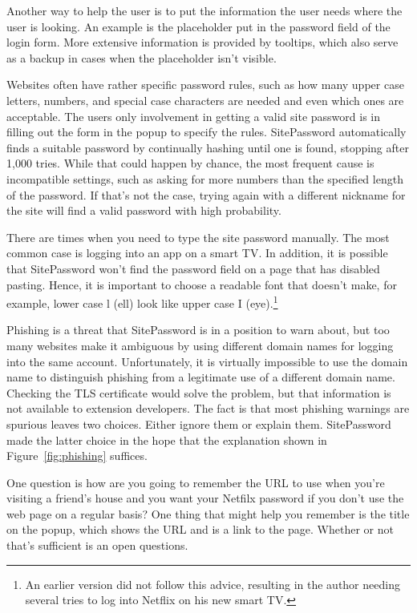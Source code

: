 Another way to help the user is to put the information the user needs where the user is looking.  An example is the placeholder put in the password field of the login form. More extensive information is provided by tooltips, which also serve as a backup in cases when the placeholder isn't visible.

Websites often have rather specific password rules, such as how many upper case letters, numbers, and special case characters are needed and even which ones are acceptable.  The users only involvement in getting a valid site password is in filling out the form in the popup to specify the rules.  SitePassword automatically finds a suitable password by continually hashing until one is found, stopping after 1,000 tries.  While that could happen by chance, the most frequent cause is incompatible settings, such as asking for more numbers than the specified length of the password.  If that's not the case, trying again with a different nickname for the site will find a valid password with high probability.

There are times when you need to type the site password manually.  The most common case is logging into an app on a smart TV.  In addition, it is possible that SitePassword won't find the password field on a page that has disabled pasting.  Hence, it is important to choose a readable font that doesn't make, for example, lower case l (ell) look like upper case I (eye).\footnote{An earlier version did not follow this advice, resulting in the author needing several tries to log into Netflix on his new smart TV.} 

Phishing is a threat that SitePassword is in a position to warn about, but too many websites make it ambiguous by using different domain names for logging into the same account.  Unfortunately, it is virtually impossible to use the domain name to distinguish phishing from a legitimate use of a different domain name.  Checking the TLS certificate would solve the  problem, but that information is not available to extension developers.  The fact is that most phishing warnings are spurious leaves two choices.  Either ignore them or explain them.  SitePassword made the latter choice in the hope that the explanation shown in Figure~\ref{fig:phishing} suffices.  

One question is how are you going to remember the URL to use when you're visiting a friend's house and you want your Netfilx password if you don't use the web page on a regular basis?  One thing that might help you remember is the title on the popup, which shows the URL and is a link to the page.  Whether or not that's sufficient is an open questions.

